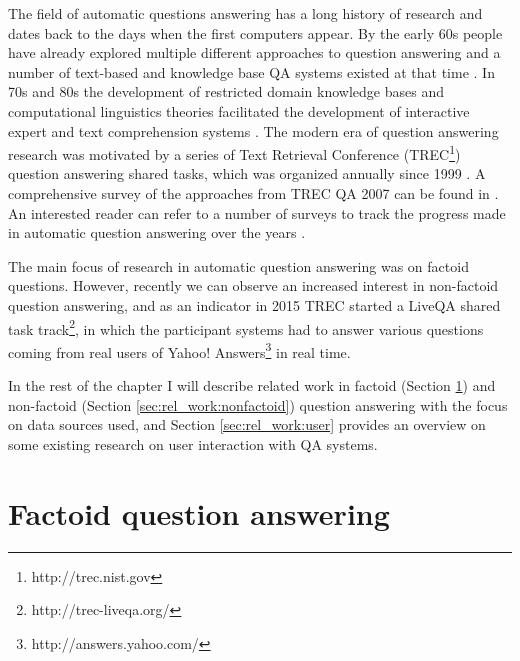%

\label{chapter:related}

\noindent

The field of automatic questions answering has a long history of research and dates back to the days when the first computers appear.
By the early 60s people have already explored multiple different approaches to question answering and a number of text-based and knowledge base QA systems existed at that time \cite{Simmons:1965:AEQ:363707.363732,Simmons:1970:NLQ:361953.361963}.
In 70s and 80s the development of restricted domain knowledge bases and computational linguistics theories facilitated the development of interactive expert and text comprehension systems \cite{androutsopoulos1995natural,shortliffe1975model,woods1977lunar,wilensky1988berkeley}.
The modern era of question answering research was motivated by a series of Text Retrieval Conference (TREC\footnote{http://trec.nist.gov}) question answering shared tasks, which was organized annually since 1999 \cite{voorhees2001trec}.
A comprehensive survey of the approaches from TREC QA 2007 can be found in \cite{dang2007overview}.
An interested reader can refer to a number of surveys to track the progress made in automatic question answering over the years  \cite{hirschman2001natural,andrenucci2005automated,wang2006survey,Kolomiyets:2011:SQA:2046840.2047162,prager2006open,allam2012question,gupta2012survey}.

The main focus of research in automatic question answering was on factoid questions.
However, recently we can observe an increased interest in non-factoid question answering, and as an indicator in 2015 TREC started a LiveQA shared task track\footnote{http://trec-liveqa.org/}, in which the participant systems had to answer various questions coming from real users of Yahoo! Answers\footnote{http://answers.yahoo.com/} in real time.

In the rest of the chapter I will describe related work in factoid (Section \ref{sec:rel_work:factoid}) and non-factoid (Section \ref{sec:rel_work:nonfactoid}) question answering with the focus on data sources used, and Section \ref{sec:rel_work:user} provides an overview on some existing research on user interaction with QA systems.

\section{Factoid question answering}
\label{sec:rel_work:factoid}

